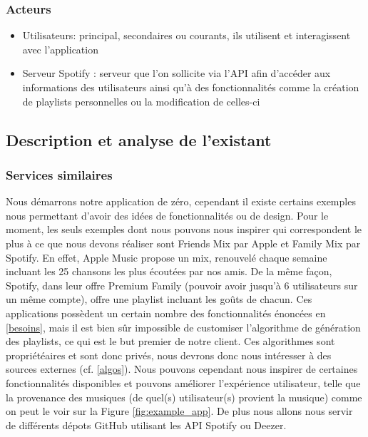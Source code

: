 \documentclass{article}
\begin{document}
		\subsubsection{Acteurs}
		\begin{itemize}
			\item Utilisateurs: principal, secondaires ou courants, ils utilisent et interagissent avec l'application
			\item Serveur Spotify : serveur que l'on sollicite via l'API afin d'accéder aux informations des utilisateurs ainsi qu'à des fonctionnalités comme la création de playlists personnelles ou la modification de celles-ci 
		\end{itemize}

		\subsection{Description et analyse de l'existant}
		\subsubsection{Services similaires}
		Nous démarrons notre application de zéro, cependant il existe certains exemples nous permettant d'avoir des idées de fonctionnalités ou de design. Pour le moment, les seuls exemples dont nous pouvons nous inspirer qui correspondent le plus à ce que nous devons réaliser sont Friends Mix par Apple et Family Mix par Spotify. En effet, Apple Music propose un mix, renouvelé chaque semaine incluant les 25 chansons les plus écoutées par nos amis. De la même façon, Spotify, dans leur offre Premium Family (pouvoir avoir jusqu'à 6 utilisateurs sur un même compte), offre une playlist incluant les goûts de chacun. Ces applications possèdent un certain nombre des fonctionnalités énoncées en \ref{besoins}, mais il est bien sûr impossible de customiser l'algorithme de génération des playlists, ce qui est le but premier de notre client. Ces algorithmes sont propriétéaires et sont donc privés, nous devrons donc nous intéresser à des sources externes (cf. \ref{algos}). Nous pouvons cependant nous inspirer de certaines fonctionnalités disponibles et pouvons améliorer l'expérience utilisateur, telle que la provenance des musiques (de quel(s) utilisateur(s) provient la musique) comme on peut le voir sur la Figure \ref{fig:example_app}.
		De plus nous allons nous servir de différents dépots GitHub utilisant les API Spotify \cite{spotify-web-api} ou Deezer.
								
\end{document}
